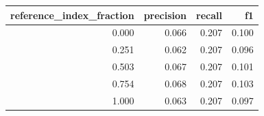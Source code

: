 \begin{tabular}{rrrr}
\toprule
reference\_index\_fraction & precision & recall & f1 \\
\midrule
0.000 & 0.066 & 0.207 & 0.100 \\
0.251 & 0.062 & 0.207 & 0.096 \\
0.503 & 0.067 & 0.207 & 0.101 \\
0.754 & 0.068 & 0.207 & 0.103 \\
1.000 & 0.063 & 0.207 & 0.097 \\
\bottomrule
\end{tabular}

